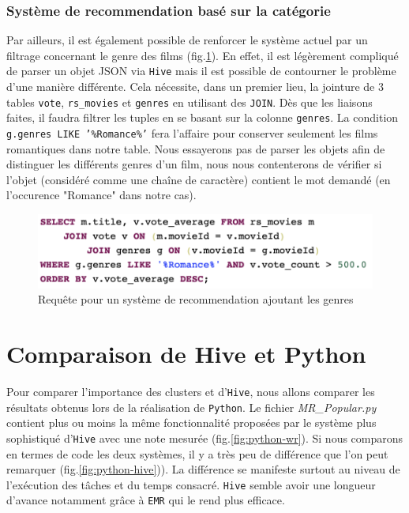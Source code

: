 \documentclass[a4paper, 12pt, oneside]{book}
\begin{document}
\subsection{Système de recommendation basé sur la catégorie}
Par ailleurs, il est également possible de renforcer le système actuel par un filtrage concernant le genre des films (fig.\ref{fig:hive-categorie}). En effet, il est légèrement compliqué de parser un objet JSON via \texttt{Hive} mais il est possible de contourner le problème d'une manière différente. Cela nécessite, dans un premier lieu, la jointure de 3 tables \texttt{vote}, \texttt{rs\_movies} et \texttt{genres} en utilisant des \texttt{JOIN}. Dès que les liaisons faites, il faudra filtrer les tuples en se basant sur la colonne \texttt{genres}. La condition \texttt{g.genres LIKE '\%Romance\%'} fera l'affaire pour conserver seulement les films romantiques dans notre table. Nous essayerons pas de parser les objets afin de distinguer les différents genres d'un film, nous nous contenterons de vérifier si l'objet (considéré comme une chaîne de caractère) contient le mot demandé (en l'occurence "Romance" dans notre cas).

\begin{figure}[H]
  \centering
  \includegraphics[width=1.0\textwidth]{images/hive-categorie}
  \caption{Requête pour un système de recommendation ajoutant les genres}
  \label{fig:hive-categorie}
\end{figure}

\chapter{Comparaison de Hive et Python}
Pour comparer l'importance des clusters et d'\texttt{Hive}, nous allons comparer les résultats obtenus lors de la réalisation de \texttt{Python}. Le fichier \textit{MR\_Popular.py} contient plus ou moins la même fonctionnalité proposées par le système plus sophistiqué d'\texttt{Hive} avec une note mesurée (fig.\ref{fig:python-wr}). 
\newline
Si nous comparons en termes de code les deux systèmes, il y a très peu de différence que l'on peut remarquer (fig.\ref{fig:python-hive})). La différence se manifeste surtout au niveau de l'exécution des tâches et du temps consacré. \texttt{Hive} semble avoir une longueur d'avance notamment grâce à \texttt{EMR} qui le rend plus efficace.
\end{document}
